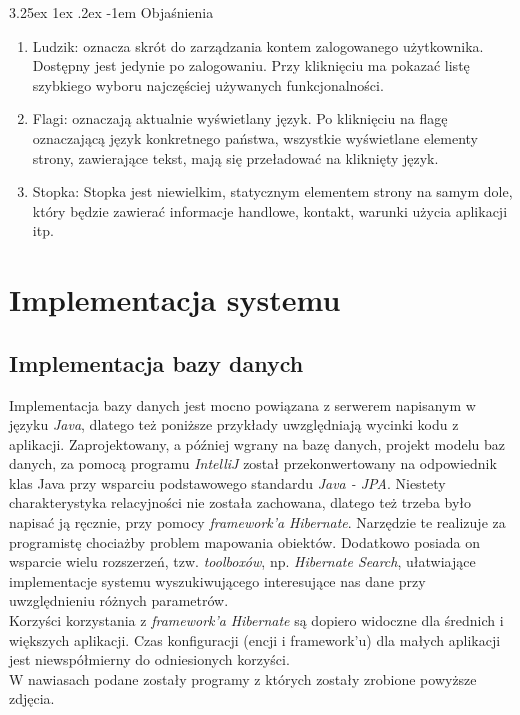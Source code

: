 \documentclass[10pt,titlepage]{article} %
\makeatletter
\renewcommand{\normalsize}{\fontsize{8pt}{10pt}\selectfont} %
\renewcommand\paragraph{\@startsection{paragraph}{5}{\z@}%
  {3.25ex \@plus1ex \@minus.2ex}%
  {-1em}%
  {\normalfont\normalsize\bfseries}}
\makeatother
\begin{document}
\paragraph{Objaśnienia}\mbox{}\\
\begin{enumerate}[1.]
\item Ludzik: oznacza skrót do zarządzania kontem zalogowanego użytkownika. Dostępny jest jedynie po zalogowaniu. Przy kliknięciu ma pokazać listę szybkiego wyboru najczęściej używanych funkcjonalności.
\item Flagi: oznaczają aktualnie wyświetlany język. Po kliknięciu na flagę oznaczającą język konkretnego państwa, wszystkie wyświetlane elementy strony, zawierające tekst, mają się przeładować  na kliknięty język.
\item Stopka: Stopka jest niewielkim, statycznym elementem strony na samym dole, który będzie zawierać informacje handlowe, kontakt, warunki użycia aplikacji itp.
\end{enumerate}

\newpage
\section{Implementacja systemu}
\subsection{Implementacja bazy danych}
Implementacja bazy danych jest mocno powiązana z serwerem napisanym w języku \textit{Java}, dlatego też poniższe przykłady uwzględniają wycinki kodu z aplikacji.
Zaprojektowany, a później wgrany na bazę danych, projekt modelu baz danych, za pomocą programu \textit{IntelliJ} został przekonwertowany na odpowiednik klas Java przy wsparciu podstawowego standardu \textit{Java - JPA}. Niestety charakterystyka relacyjności nie została zachowana, dlatego też trzeba było napisać ją ręcznie, przy pomocy \textit{framework'a} \textit{Hibernate}. Narzędzie te realizuje za programistę chociażby problem mapowania obiektów. Dodatkowo posiada on wsparcie wielu rozszerzeń, tzw. \textit{toolboxów}, np. \textit{Hibernate Search}, ułatwiające implementacje systemu wyszukiwującego interesujące nas dane przy uwzględnieniu różnych parametrów.\mbox{}\\
Korzyści korzystania z \textit{framework'a} \textit{Hibernate} są dopiero widoczne dla średnich i większych aplikacji. Czas konfiguracji (encji i framework'u) dla małych aplikacji jest niewspółmierny do odniesionych korzyści.\mbox{}\\
W nawiasach podane zostały programy z których zostały zrobione powyższe zdjęcia.
\end{document}
